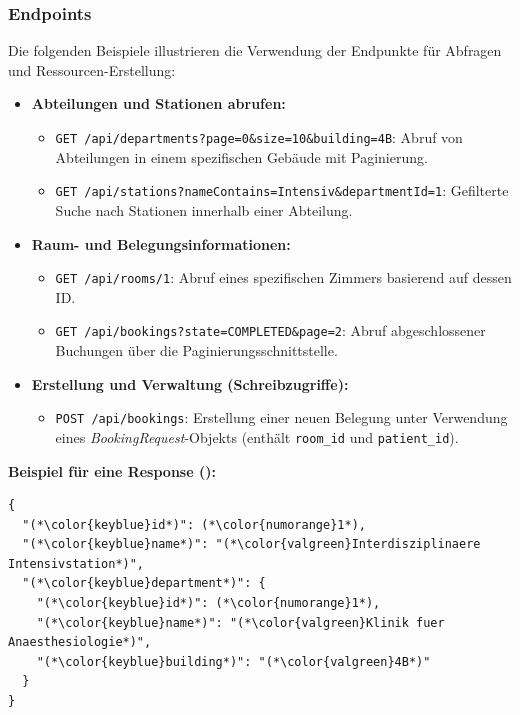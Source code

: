 \subsubsection{Endpoints}
Die folgenden Beispiele illustrieren die Verwendung der Endpunkte für Abfragen und Ressourcen-Erstellung:

\begin{itemize}
    \item \textbf{Abteilungen und Stationen abrufen:}
    \begin{itemize}
        \item \texttt{GET /api/departments?page=0\&size=10\&building=4B}: Abruf von Abteilungen in einem spezifischen Gebäude mit Paginierung.
        \item \texttt{GET /api/stations?nameContains=Intensiv\&departmentId=1}: Gefilterte Suche nach Stationen innerhalb einer Abteilung.
    \end{itemize}
    
    \item \textbf{Raum- und Belegungsinformationen:}
    \begin{itemize}
        \item \texttt{GET /api/rooms/1}: Abruf eines spezifischen Zimmers basierend auf dessen ID.
        \item \texttt{GET /api/bookings?state=COMPLETED\&page=2}: Abruf abgeschlossener Buchungen über die Paginierungsschnittstelle.
    \end{itemize}
    
    \item \textbf{Erstellung und Verwaltung (Schreibzugriffe):}
    \begin{itemize}
        \item \texttt{POST /api/bookings}: Erstellung einer neuen Belegung unter Verwendung eines \textit{BookingRequest}-Objekts (enthält \texttt{room\_id} und \texttt{patient\_id}).
    \end{itemize}
\end{itemize}


\textbf{Beispiel für eine Response (\texttt{}):}

\begin{lstlisting}
{
  "(*\color{keyblue}id*)": (*\color{numorange}1*),
  "(*\color{keyblue}name*)": "(*\color{valgreen}Interdisziplinaere Intensivstation*)",
  "(*\color{keyblue}department*)": {
    "(*\color{keyblue}id*)": (*\color{numorange}1*),
    "(*\color{keyblue}name*)": "(*\color{valgreen}Klinik fuer Anaesthesiologie*)",
    "(*\color{keyblue}building*)": "(*\color{valgreen}4B*)"
  }
}
\end{lstlisting}

